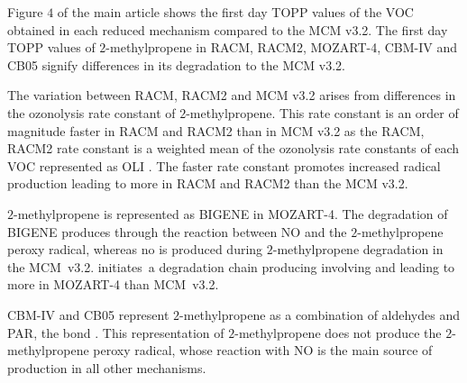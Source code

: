 %
Figure $4$ of the main article shows the first day TOPP values of the VOC obtained in each reduced mechanism compared to the MCM v3.2.
The first day TOPP values of $2$-methylpropene in RACM, RACM2, MOZART-4, CBM-IV and CB05 signify differences in its degradation to the MCM v3.2.

The variation between RACM, RACM2 and MCM v3.2 arises from differences in the ozonolysis rate constant of $2$-methylpropene.
This rate constant is an order of magnitude faster in RACM and RACM2 than in MCM v3.2 as the RACM, RACM2 rate constant is a weighted mean of the ozonolysis rate constants of each VOC represented as OLI \citep{Stockwell:1997, Goliff:2013}.
The faster rate constant promotes increased radical production leading to more  in RACM and RACM2 than the MCM v3.2.

$2$-methylpropene is represented as BIGENE in MOZART-4. 
The degradation of BIGENE produces  through the reaction between NO and the $2$-methylpropene peroxy radical, whereas no  is produced during $2$-methylpropene degradation in the \mbox{MCM v3.2}.
 \mbox{initiates a} degradation chain producing  involving  and  leading to more  in MOZART-4 than \mbox{MCM v3.2}.

CBM-IV and CB05 represent $2$-methylpropene as a combination of aldehydes and PAR, the  bond \citep{Gery:1989, Yarwood:2005}.
This representation of $2$-methylpropene does not produce the $2$-methylpropene peroxy radical, whose reaction with NO is the main source of  production in all other mechanisms.

